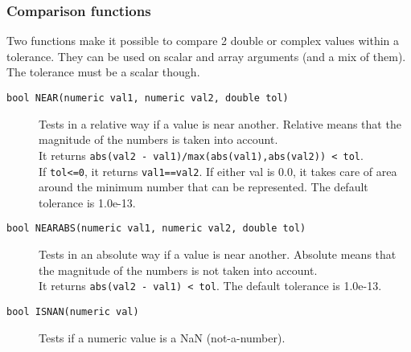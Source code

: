 \subsubsection{Comparison functions}
Two functions make it possible to compare 2 double or complex
values within a tolerance.
They can be used on scalar and array arguments (and a mix of them).
The tolerance must be a scalar though.
\begin{description}
  \item[ \texttt{bool NEAR(numeric val1, numeric val2, double tol)}]
    Tests in a relative way if a value is near another. Relative
    means that the
    magnitude of the numbers is taken into account.
    \\It returns
    \texttt{abs(val2 - val1)/max(abs(val1),abs(val2)) < tol}.
    \\If \texttt{tol<=0}, it returns \texttt{val1==val2}.
    If either val is 0.0, it takes
    care of area around the minimum number that can be represented.
    The default tolerance is 1.0e-13.
  \item[ \texttt{bool NEARABS(numeric val1, numeric val2, double tol)}]
    Tests in an absolute way if a value is near another. Absolute
    means that the
    magnitude of the numbers is not taken into account.
    \\It returns \texttt{abs(val2 - val1) < tol}.
    The default tolerance is 1.0e-13.
  \item[ \texttt{bool ISNAN(numeric val)}]
    Tests if a numeric value is a NaN (not-a-number).
\end{description}

